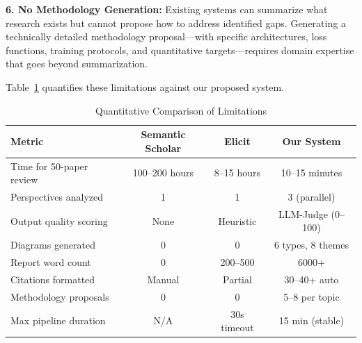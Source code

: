 \textbf{6. No Methodology Generation:} Existing systems can summarize what research exists but cannot propose how to address identified gaps. Generating a technically detailed methodology proposal---with specific architectures, loss functions, training protocols, and quantitative targets---requires domain expertise that goes beyond summarization.

Table~\ref{tab:limitations} quantifies these limitations against our proposed system.

\begin{table}[H]
\centering
\caption{Quantitative Comparison of Limitations}
\label{tab:limitations}
\begin{tabularx}{\textwidth}{|X|c|c|c|}
\hline
\textbf{Metric} & \textbf{Semantic Scholar} & \textbf{Elicit} & \textbf{Our System} \\
\hline
Time for 50-paper review & 100--200 hours & 8--15 hours & 10--15 minutes \\
\hline
Perspectives analyzed & 1 & 1 & 3 (parallel) \\
\hline
Output quality scoring & None & Heuristic & LLM-Judge (0--100) \\
\hline
Diagrams generated & 0 & 0 & 6 types, 8 themes \\
\hline
Report word count & 0 & 200--500 & 6000+ \\
\hline
Citations formatted & Manual & Partial & 30--40+ auto \\
\hline
Methodology proposals & 0 & 0 & 5--8 per topic \\
\hline
Max pipeline duration & N/A & 30s timeout & 15 min (stable) \\
\hline
\end{tabularx}
\end{table}
